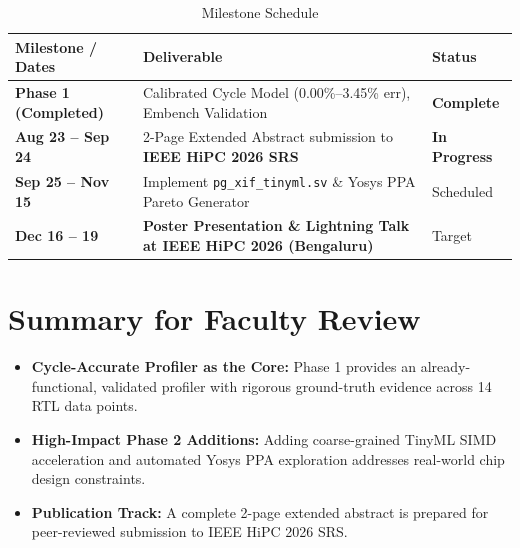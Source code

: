 \documentclass[11pt,a4paper]{article}
\begin{document}
\begin{table}[h]
\centering
\small
\caption{Milestone Schedule}
\begin{tabular}{lll}
\toprule
\textbf{Milestone / Dates} & \textbf{Deliverable} & \textbf{Status} \\
\midrule
\textbf{Phase 1 (Completed)} & Calibrated Cycle Model (0.00\%--3.45\% err), Embench Validation & \textbf{Complete} \\
\textbf{Aug 23 -- Sep 24} & 2-Page Extended Abstract submission to \textbf{IEEE HiPC 2026 SRS} & \textbf{In Progress} \\
\textbf{Sep 25 -- Nov 15} & Implement \texttt{pg\_xif\_tinyml.sv} \& Yosys PPA Pareto Generator & Scheduled \\
\textbf{Dec 16 -- 19} & \textbf{Poster Presentation \& Lightning Talk at IEEE HiPC 2026 (Bengaluru)} & Target \\
\bottomrule
\end{tabular}
\end{table}

\section{Summary for Faculty Review}
\begin{itemize}[leftmargin=*]
    \item \textbf{Cycle-Accurate Profiler as the Core:} Phase 1 provides an already-functional, validated profiler with rigorous ground-truth evidence across 14 RTL data points.
    \item \textbf{High-Impact Phase 2 Additions:} Adding coarse-grained TinyML SIMD acceleration and automated Yosys PPA exploration addresses real-world chip design constraints.
    \item \textbf{Publication Track:} A complete 2-page extended abstract is prepared for peer-reviewed submission to IEEE HiPC 2026 SRS.
\end{itemize}
\end{document}
